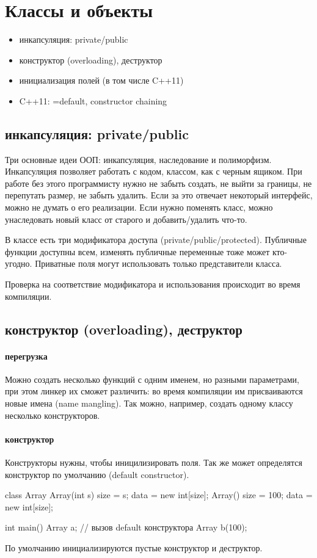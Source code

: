 \section{Классы и объекты}
\begin{itemize}[noitemsep]
    \item инкапсуляция: private/public
    \item конструктор (overloading), деструктор
    \item инициализация полей (в том числе C++11)
    \item C++11: =default, constructor chaining
\end{itemize}
\subsection{инкапсуляция: private/public}
Три основные идеи ООП: инкапсуляция, наследование и полиморфизм.
Инкапсуляция позволяет работать с кодом, классом, как с черным ящиком. При работе без этого программисту нужно не забыть создать, не выйти за границы, не перепутать размер, не забыть удалить. 
Если за это отвечает некоторый интерфейс, можно не думать о его реализации. Если нужно поменять класс, можно унаследовать новый класс от старого и добавить/удалить что-то.

В классе есть три модификатора доступа (private/public/protected). Публичные функции доступны всем, изменять публичные переменные тоже может кто-угодно. Приватные поля могут использовать только представители класса.

Проверка на соответствие модификатора и использования происходит во время компиляции.
\subsection{конструктор (overloading), деструктор}
\paragraph{перегрузка}
Можно создать несколько функций с одним именем, но разными параметрами, при этом линкер их сможет различить: во время компиляции  им присваиваются новые имена (name mangling). Так можно, например, создать одному классу несколько конструкторов.
\paragraph{конструктор}
Конструкторы нужны, чтобы иницилизировать поля. Так же может определятся конструктор по умолчанию (default constructor).
\begin{ccode}
class Array {
    Array(int s) { size = s; data = new int[size]; }
    Array() { size = 100; data = new int[size]; }
}

int main() {
    Array a; // вызов default конструктора
    Array b(100);
}
\end{ccode}
 По умолчанию инициализируются пустые конструктор и деструктор.

